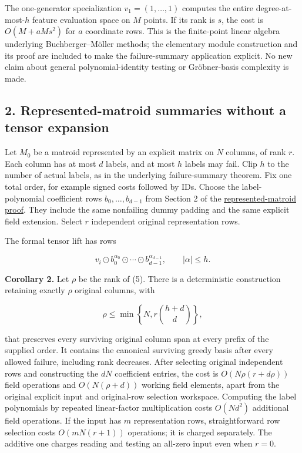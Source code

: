 The one-generator specialization \(v_1=(1,\ldots,1)\) computes the entire degree-at-most-\(h\) feature evaluation space on \(M\) points. If its rank is \(s\), the cost is \(O(M+aMs^2)\) for \(a\) coordinate rows. This is the finite-point linear algebra underlying Buchberger--Möller methods; the elementary module construction and its proof are included to make the failure-summary application explicit. No new claim about general polynomial-identity testing or Gröbner-basis complexity is made.

\hypertarget{af-4b125c3959-represented-matroid-summaries-without-a-tensor-expansion}{%
\subsection{2. Represented-matroid summaries without a tensor expansion}\label{af-4b125c3959-represented-matroid-summaries-without-a-tensor-expansion}}

Let \(M_0\) be a matroid represented by an explicit matrix on \(N\) columns, of rank \(r\). Each column has at most \(d\) labels, and at most \(h\) labels may fail. Clip \(h\) to the number of actual labels, as in the underlying failure-summary theorem. Fix one total order, for example signed costs followed by IDs. Choose the label-polynomial coefficient rows \(b_0,\ldots,b_{d-1}\) from Section 2 of the \href{https://github.com/icekylinx/algorithm-frontier/blob/main/problems/matroid-failure-summaries/manuscripts/sharp-represented-matroid-failure-summaries.md}{represented-matroid proof}. They include the same nonfailing dummy padding and the same explicit field extension. Select \(r\) independent original representation rows.

The formal tensor lift has rows

\[
v_i\odot b_0^{\alpha_0}\odot\cdots\odot b_{d-1}^{\alpha_{d-1}},
 \qquad |\alpha|\le h.
\tag{5}
\]

\textbf{Corollary 2.} Let \(\rho\) be the rank of (5). There is a deterministic construction retaining exactly \(\rho\) original columns, with

\[
\rho\le\min\left\{N,r\binom{h+d}{d}\right\},
\tag{6}
\]

that preserves every surviving original column span at every prefix of the supplied order. It contains the canonical surviving greedy basis after every allowed failure, including rank decreases. After selecting original independent rows and constructing the \(dN\) coefficient entries, the cost is \(O(N\rho(r+d\rho))\) field operations and \(O(N(\rho+d))\) working field elements, apart from the original explicit input and original-row selection workspace. Computing the label polynomials by repeated linear-factor multiplication costs \(O(Nd^2)\) additional field operations. If the input has \(m\) representation rows, straightforward row selection costs \(O(mN(r+1))\) operations; it is charged separately. The additive one charges reading and testing an all-zero input even when \(r=0\).

